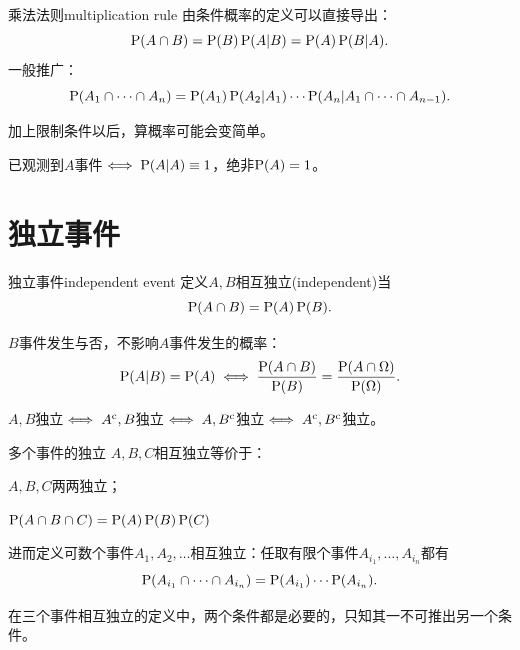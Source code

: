 \begin{theorem}{乘法法则}{multiplication rule}
	由条件概率的定义可以直接导出：
	\begin{equation}
		\P(A\cap B)=\P(B)\P(A|B)=\P(A)\P(B|A).
	\end{equation}
	一般推广：
	\[
		\P(A_1\cap\cdots\cap A_n)=\P(A_1)\P(A_2|A_1)\cdots\P(A_n|A_1\cap\cdots\cap A_{n-1}).
	\]
\end{theorem}

\begin{remark}
	加上限制条件以后，算概率可能会变简单。
\end{remark}

\begin{remark}
	已观测到$A$事件$\iff\P(A|A)\equiv 1$，绝非$\P(A)=1$。
\end{remark}

\section{独立事件}

\begin{definition}{独立事件}{independent event}
	定义$A,B$相互独立(independent)当
	\begin{equation}
		\P(A\cap B)=\P(A)\P(B).
	\end{equation}
\end{definition}

$B$事件发生与否，不影响$A$事件发生的概率：
\[
	\P(A|B)=\P(A)\iff\frac{\P(A\cap B)}{\P(B)}=\frac{\P(A\cap\Omega)}{\P(\Omega)}.
\]

\begin{corollary}
	$A,B$独立$\iff A\c,B$独立$\iff A,B\c$独立$\iff A\c,B\c$独立。
\end{corollary}

\begin{definition}{多个事件的独立}{}
	$A,B,C$相互独立等价于：
	\begin{compactenum}
		\item $A,B,C$两两独立；
		\item $\P(A\cap B\cap C)=\P(A)\P(B)\P(C)$
	\end{compactenum}
	进而定义可数个事件$A_1,A_2,\ldots$相互独立：任取有限个事件$A_{i_1},\ldots,A_{i_n}$都有
	\[
		\P(A_{i_1}\cap\cdots\cap A_{i_n})=\P(A_{i_1})\cdots\P(A_{i_n}).
	\]
\end{definition}

\begin{remark}
	在三个事件相互独立的定义中，两个条件都是必要的，只知其一不可推出另一个条件。
\end{remark}



